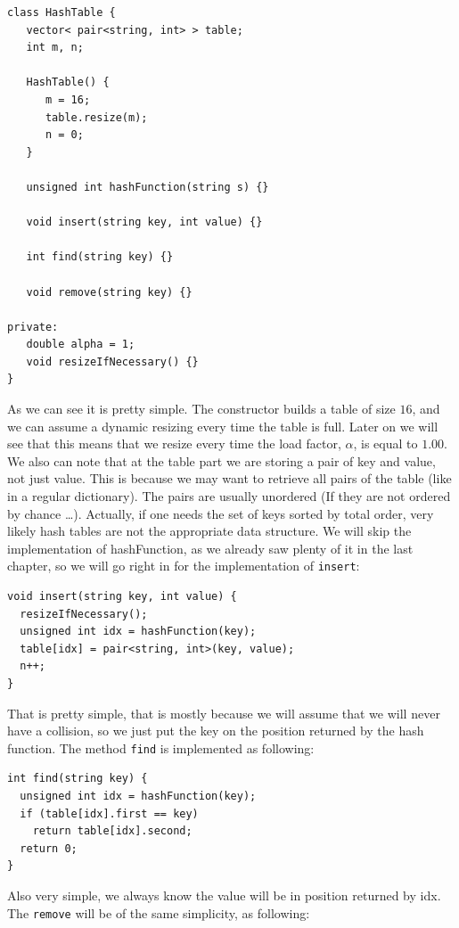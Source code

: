 \begin{lstlisting}
class HashTable {
   vector< pair<string, int> > table;
   int m, n;
   
   HashTable() {
      m = 16;
      table.resize(m);
      n = 0;
   }

   unsigned int hashFunction(string s) {}
   
   void insert(string key, int value) {}

   int find(string key) {}

   void remove(string key) {}

private:
   double alpha = 1;
   void resizeIfNecessary() {}
}
\end{lstlisting}

As we can see it is pretty simple. The constructor builds a table of size \( 16 \), and we can assume a dynamic resizing every time the table is full. Later on we will see that this means that we resize every time the load factor, \( \alpha \), is equal to \( 1.00 \). We also can note that at the table part we are storing a pair of key and value, not just value. This is because we may want to retrieve all pairs of the table (like in a regular dictionary). The pairs are usually unordered (If they are not ordered by chance \dots). Actually, if one needs the set of keys sorted by total order, very likely hash tables are not the appropriate data structure. We will skip the implementation of hashFunction, as we already saw plenty of it in the last chapter, so we will go right in for the implementation of \texttt{insert}:

\begin{lstlisting}
void insert(string key, int value) {
  resizeIfNecessary();
  unsigned int idx = hashFunction(key);
  table[idx] = pair<string, int>(key, value);
  n++;
}
\end{lstlisting}

That is pretty simple, that is mostly because we will assume that we will never have a collision, so we just put the key on the position returned by the hash function. The method \texttt{find} is implemented as following:

\begin{lstlisting}
int find(string key) {
  unsigned int idx = hashFunction(key);
  if (table[idx].first == key)
    return table[idx].second;
  return 0;
}
\end{lstlisting}

Also very simple, we always know the value will be in position returned by idx. The \texttt{remove} will be of the same simplicity, as following:

